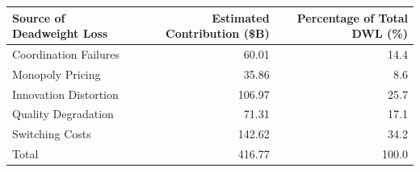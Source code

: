 

\begin{tabular}{@{}lrr@{}}
\toprule
Source of Deadweight Loss & Estimated Contribution (\$B) & Percentage of Total DWL (\%) \\
\midrule
Coordination Failures & 60.01 & 14.4 \\
Monopoly Pricing & 35.86 & 8.6 \\
Innovation Distortion & 106.97 & 25.7 \\
Quality Degradation & 71.31 & 17.1 \\
Switching Costs & 142.62 & 34.2 \\
Total & 416.77 & 100.0 \\
\bottomrule
\end{tabular}